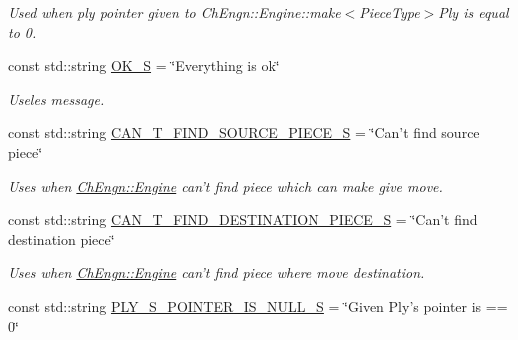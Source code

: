 \begin{DoxyCompactItemize}
\begin{DoxyCompactList}\small\item\em Used when ply pointer given to ChEngn::Engine::make$<$PieceType$>$Ply is equal to 0. \item\end{DoxyCompactList}\item 
\hypertarget{namespaceChEngn_a669b96f20597d4a0b00d4c9e4db68ee8}{
const std::string \hyperlink{namespaceChEngn_a669b96f20597d4a0b00d4c9e4db68ee8}{OK\_\-S} = \char`\"{}Everything is ok\char`\"{}}
\label{namespaceChEngn_a669b96f20597d4a0b00d4c9e4db68ee8}

\begin{DoxyCompactList}\small\item\em Useles message. \item\end{DoxyCompactList}\item 
\hypertarget{namespaceChEngn_afcb9219c354a7e8e1374e15cd5be767f}{
const std::string \hyperlink{namespaceChEngn_afcb9219c354a7e8e1374e15cd5be767f}{CAN\_\-T\_\-FIND\_\-SOURCE\_\-PIECE\_\-S} = \char`\"{}Can't find source piece\char`\"{}}
\label{namespaceChEngn_afcb9219c354a7e8e1374e15cd5be767f}

\begin{DoxyCompactList}\small\item\em Uses when \hyperlink{classChEngn_1_1Engine}{ChEngn::Engine} can't find piece which can make give move. \item\end{DoxyCompactList}\item 
\hypertarget{namespaceChEngn_a8bc85688808005c9d9c49aa2474809d1}{
const std::string \hyperlink{namespaceChEngn_a8bc85688808005c9d9c49aa2474809d1}{CAN\_\-T\_\-FIND\_\-DESTINATION\_\-PIECE\_\-S} = \char`\"{}Can't find destination piece\char`\"{}}
\label{namespaceChEngn_a8bc85688808005c9d9c49aa2474809d1}

\begin{DoxyCompactList}\small\item\em Uses when \hyperlink{classChEngn_1_1Engine}{ChEngn::Engine} can't find piece where move destination. \item\end{DoxyCompactList}\item 
\hypertarget{namespaceChEngn_afbdf882021d19396728801e116518dac}{
const std::string \hyperlink{namespaceChEngn_afbdf882021d19396728801e116518dac}{PLY\_\-S\_\-POINTER\_\-IS\_\-NULL\_\-S} = \char`\"{}Given Ply's pointer is == 0\char`\"{}}
\label{namespaceChEngn_afbdf882021d19396728801e116518dac}


\end{DoxyCompactItemize}
